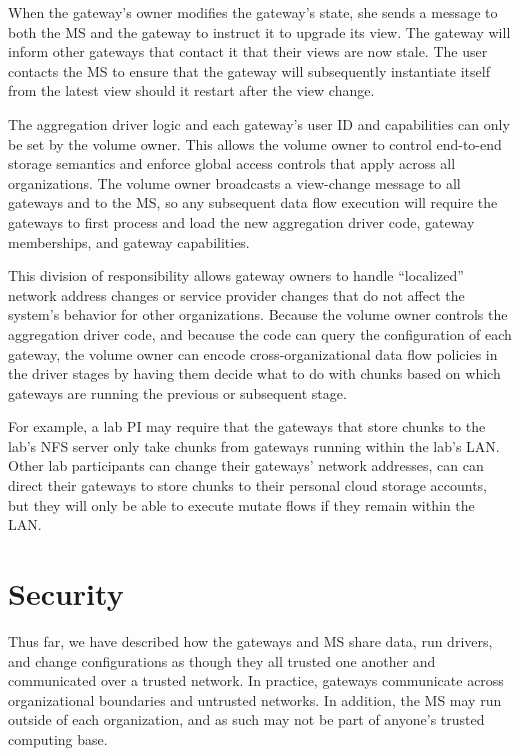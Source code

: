 When the gateway's owner modifies the gateway's state, she sends a message to
both the MS and the gateway to instruct it to upgrade its view.
The gateway will inform other gateways that contact it that their views are now
stale.  The user contacts the MS to ensure that the gateway will subsequently
instantiate itself from the latest view should it restart after the view change.

The aggregation driver logic and each gateway's user ID and capabilities
can only be set by the volume owner.  This allows the volume owner to control
end-to-end storage semantics and enforce global access controls that apply
across all organizations.  The volume owner broadcasts a view-change message to
all gateways and to the MS, so any subsequent data flow execution will require
the gateways to first process and load the new aggregation driver code, gateway
memberships, and gateway capabilities.

This division of responsibility allows gateway owners to handle ``localized''
network address changes or service provider changes that do not affect the
system's behavior for other organizations.  Because the volume owner controls
the aggregation driver code, and because the code can query the 
configuration of each gateway, the volume owner can encode cross-organizational
data flow policies in the driver stages by having them decide what to do with
chunks based on which gateways are running the previous or subsequent stage.

For example, a lab PI may require that the gateways that store chunks
to the lab's NFS server only take chunks from gateways running within the lab's
LAN.  Other lab participants can change their gateways' network addresses, can
can direct their gateways to store chunks to their personal cloud storage
accounts, but they will only be able to execute mutate flows if they remain
within the LAN.

\section{Security}

Thus far, we have described how the gateways and MS share data, run drivers, and
change configurations as though they all trusted one another and communicated
over a trusted network.  In practice, gateways communicate across organizational
boundaries and untrusted networks.  In addition, the MS may run outside
of each organization, and as such may not be part of anyone's trusted
computing base.

